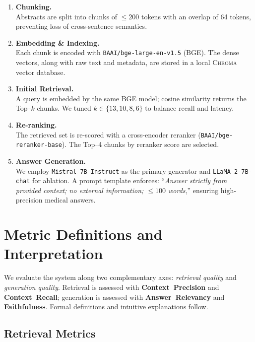 \documentclass[conference]{IEEEtran}
\begin{document}
\begin{enumerate}[leftmargin=*]
  \item \textbf{Chunking.}  \\
        Abstracts are split into chunks of $\le200$ tokens with an overlap of 64 tokens, preventing loss of cross-sentence semantics.

  \item \textbf{Embedding \& Indexing.}  \\
        Each chunk is encoded with \texttt{BAAI/bge-large-en-v1.5} (BGE).  
        The dense vectors, along with raw text and metadata, are stored in a local \textsc{Chroma} vector database.

  \item \textbf{Initial Retrieval.}  \\
        A query is embedded by the same BGE model; cosine similarity returns the Top–$k$ chunks.  
        We tuned $k\!\in\!\{13,10,8,6\}$ to balance recall and latency.

  \item \textbf{Re-ranking.}  \\
        The retrieved set is re-scored with a cross-encoder reranker (\texttt{BAAI/bge-reranker-base}).  
        The Top–4 chunks by reranker score are selected.

  \item \textbf{Answer Generation.}  \\
        We employ \texttt{Mistral-7B-Instruct} as the primary generator and \texttt{LLaMA-2-7B-chat} for ablation.  
        A prompt template enforces: “\emph{Answer strictly from provided context; no external information; $\le100$ words},” ensuring high-precision medical answers.
\end{enumerate}


\section{Metric Definitions and Interpretation}\cite{ragas_metrics}
We evaluate the system along two complementary axes: \emph{retrieval quality}
and \emph{generation quality}.  Retrieval is assessed with \textbf{Context~Precision}
and \textbf{Context~Recall}; generation is assessed with \textbf{Answer~Relevancy}
and \textbf{Faithfulness}.  Formal definitions and intuitive explanations follow.

\subsection{Retrieval Metrics}
\end{document}
